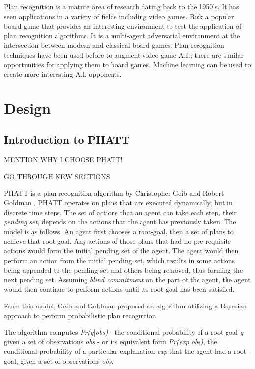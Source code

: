 \documentclass[parskip]{cs4rep}
\begin{document}
Plan recognition is a mature area of research dating back to the 1950's. It has seen applications in a variety of fields including video games. Risk a popular board game that provides an interesting environment to test the application of plan recognition algorithms. It is a multi-agent adversarial environment at the intersection between modern and classical board games. Plan recognition techniques have been used before to augment video game A.I.; there are similar opportunities for applying them to board games. Machine learning can be used to create more interesting A.I. opponents.

\chapter{Design}

\section{Introduction to PHATT}

MENTION WHY I CHOOSE PHATT!

GO THROUGH NEW SECTIONS

PHATT is a plan recognition algorithm by Christopher Geib and Robert Goldman \cite{Geib:2009:PPR:1550966.1551246}. PHATT operates on plans that are executed dynamically, but in discrete time steps. The set of actions that an agent can take each step, their \textit{pending set}, depends on the actions that the agent has previously taken.
The model is as follows. An agent first chooses a root-goal, then a set of plans to achieve that root-goal. Any actions of those plans that had no pre-requisite actions would form the initial pending set of the agent. The agent would then perform an action from the initial pending set, which results in some actions being appended to the pending set and others being removed, thus forming the next pending set. Assuming \textit{blind commitment} on the part of the agent, the agent would then continue to perform actions until its root goal has been satisfied.

From this model, Geib and Goldman proposed an algorithm utilizing a Bayesian approach to perform probabilistic plan recognition. 

The algorithm computes \textit{Pr(g}|\textit{obs)} - the conditional probability of a root-goal \textit{g} given a set of observations \textit{obs} - or its equivalent form \textit{Pr(exp}|\textit{obs)}, the conditional probability of a particular explanation \textit{exp} that the agent had a root-goal, given a set of observations \textit{obs}.
\end{document}
